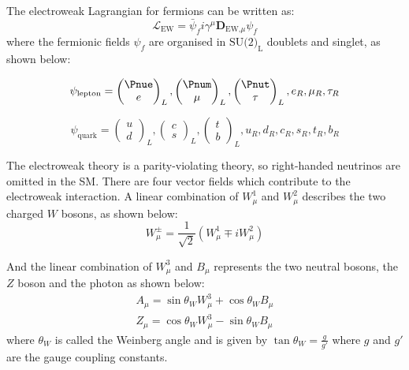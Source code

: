 The electroweak Lagrangian for fermions can be written as:
\begin{equation}
\mathcal{L}_{\text{EW}} = \bar{\psi}_{f}i\gamma^{\mu}\textbf{D}_{\text{EW,}\mu}\psi_{f}
\end{equation}
where the fermionic fields $\psi_{f}$ are organised in $\text{SU(2)}_{\text{L}}$ doublets and singlet, as shown below:

\begin{equation}
	\psi_{\text{lepton}} = \begin{pmatrix} \Pnue \\ e \end{pmatrix}_{L}, \begin{pmatrix} \Pnum \\ \mu \end{pmatrix}_{L}, \begin{pmatrix} \Pnut \\ \tau \end{pmatrix}_{L}, e_{R}, \mu_{R}, \tau_{R}
\end{equation}

\begin{equation}
\psi_{\text{quark}} = \begin{pmatrix} u \\ d \end{pmatrix}_{L}, \begin{pmatrix} c \\ s \end{pmatrix}_{L}, \begin{pmatrix} t \\ b \end{pmatrix}_{L}, u_{R}, d_{R}, c_{R}, s_{R}, t_{R}, b_{R}
\end{equation}


The electroweak theory is a parity-violating theory, so right-handed neutrinos are omitted in the SM. There are four vector fields which contribute to the electroweak interaction. A linear combination of $W^{1}_{\mu}$ and $W^{2}_{\mu}$ describes the two charged $W$ bosons, as shown below:
\begin{equation}
	W^{\pm}_{\mu} = \frac{1}{\sqrt{2}}(W^{1}_{\mu} \mp iW^{2}_{\mu})
\end{equation}

And the linear combination of $W^{3}_{\mu}$ and $B_{\mu}$ represents the two neutral bosons, the $Z$ boson and the photon as shown below:
\begin{align}
	A_{\mu} = \sin\theta_{W}W^{3}_{\mu} + \cos\theta_{W}B_{\mu} \\
	Z_{\mu} = \cos\theta_{W}W^{3}_{\mu} - \sin\theta_{W}B_{\mu}
\end{align}
where $\theta_{W}$ is called the Weinberg angle and is given by $\tan\theta_{W} = \frac{g}{g'}$ where $g$ and $g'$ are the gauge coupling constants.

